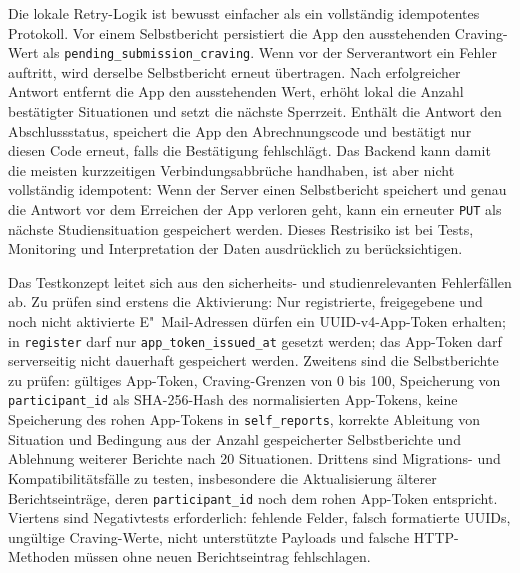 Die lokale Retry-Logik ist bewusst einfacher als ein vollständig idempotentes Protokoll. Vor einem Selbstbericht persistiert die App den ausstehenden Craving-Wert als \texttt{pending\_submission\_craving}. Wenn vor der Serverantwort ein Fehler auftritt, wird derselbe Selbstbericht erneut übertragen. Nach erfolgreicher Antwort entfernt die App den ausstehenden Wert, erhöht lokal die Anzahl bestätigter Situationen und setzt die nächste Sperrzeit. Enthält die Antwort den Abschlussstatus, speichert die App den Abrechnungscode und bestätigt nur diesen Code erneut, falls die Bestätigung fehlschlägt. Das Backend kann damit die meisten kurzzeitigen Verbindungsabbrüche handhaben, ist aber nicht vollständig idempotent: Wenn der Server einen Selbstbericht speichert und genau die Antwort vor dem Erreichen der App verloren geht, kann ein erneuter \texttt{PUT} als nächste Studiensituation gespeichert werden. Dieses Restrisiko ist bei Tests, Monitoring und Interpretation der Daten ausdrücklich zu berücksichtigen.

Das Testkonzept leitet sich aus den sicherheits- und studienrelevanten Fehlerfällen ab. Zu prüfen sind erstens die Aktivierung: Nur registrierte, freigegebene und noch nicht aktivierte E"~Mail-Adressen dürfen ein UUID-v4-App-Token erhalten; in \texttt{register} darf nur \texttt{app\_token\_issued\_at} gesetzt werden; das App-Token darf serverseitig nicht dauerhaft gespeichert werden. Zweitens sind die Selbstberichte zu prüfen: gültiges App-Token, Craving-Grenzen von 0 bis 100, Speicherung von \texttt{participant\_id} als SHA-256-Hash des normalisierten App-Tokens, keine Speicherung des rohen App-Tokens in \texttt{self\_reports}, korrekte Ableitung von Situation und Bedingung aus der Anzahl gespeicherter Selbstberichte und Ablehnung weiterer Berichte nach 20 Situationen. Drittens sind Migrations- und Kompatibilitätsfälle zu testen, insbesondere die Aktualisierung älterer Berichtseinträge, deren \texttt{participant\_id} noch dem rohen App-Token entspricht. Viertens sind Negativtests erforderlich: fehlende Felder, falsch formatierte UUIDs, ungültige Craving-Werte, nicht unterstützte Payloads und falsche HTTP-Methoden müssen ohne neuen Berichtseintrag fehlschlagen.

